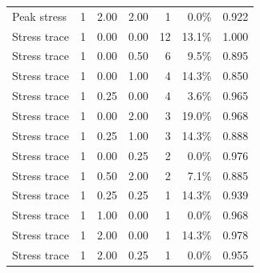 \begin{longtable}{p{35mm}rrrrrr}
Peak stress & 1 & 2.00 & 2.00 & 1 & 0.0\% & 0.922 \\
Stress trace & 1 & 0.00 & 0.00 & 12 & 13.1\% & 1.000 \\
Stress trace & 1 & 0.00 & 0.50 & 6 & 9.5\% & 0.895 \\
Stress trace & 1 & 0.00 & 1.00 & 4 & 14.3\% & 0.850 \\
Stress trace & 1 & 0.25 & 0.00 & 4 & 3.6\% & 0.965 \\
Stress trace & 1 & 0.00 & 2.00 & 3 & 19.0\% & 0.968 \\
Stress trace & 1 & 0.25 & 1.00 & 3 & 14.3\% & 0.888 \\
Stress trace & 1 & 0.00 & 0.25 & 2 & 0.0\% & 0.976 \\
Stress trace & 1 & 0.50 & 2.00 & 2 & 7.1\% & 0.885 \\
Stress trace & 1 & 0.25 & 0.25 & 1 & 14.3\% & 0.939 \\
Stress trace & 1 & 1.00 & 0.00 & 1 & 0.0\% & 0.968 \\
Stress trace & 1 & 2.00 & 0.00 & 1 & 14.3\% & 0.978 \\
Stress trace & 1 & 2.00 & 0.25 & 1 & 0.0\% & 0.955 \\
\bottomrule
\end{longtable}
